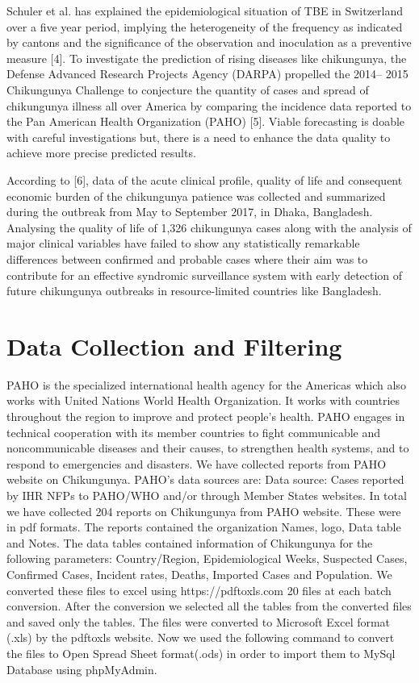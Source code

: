 \documentclass[conference]{IEEEtran}
\begin{document}
Schuler et al. has explained the epidemiological situation of TBE in Switzerland over a five year period, implying the heterogeneity of the frequency as indicated by cantons and the significance of the observation and inoculation as a preventive measure [4]. To investigate the prediction of rising diseases like chikungunya, the Defense Advanced Research Projects Agency (DARPA) propelled the 2014– 2015  Chikungunya Challenge to conjecture the quantity of cases and spread of chikungunya illness all over America by comparing the incidence data reported to the Pan American Health Organization (PAHO) [5]. Viable forecasting is doable with careful investigations but, there is a need to enhance the data quality to achieve more precise predicted results.

According to [6], data of the acute clinical profile, quality of life and consequent economic burden of the chikungunya patience was collected and summarized during the outbreak from May to September 2017, in Dhaka, Bangladesh. Analysing the quality of life of 1,326 chikungunya cases along with the analysis of major clinical variables have failed to show any statistically remarkable differences between confirmed and probable cases where their aim was to contribute for an effective syndromic surveillance system with early detection of future chikungunya outbreaks in resource-limited countries like Bangladesh.


\thispagestyle{empty}
\section{Data Collection and Filtering}

PAHO is the specialized international health agency for the Americas which also works with United Nations World Health Organization.
It works with countries throughout the region to improve and protect people's health. PAHO engages in technical cooperation with its member countries to fight communicable and noncommunicable diseases and their causes, to strengthen health systems, and to respond to emergencies and disasters.
We have collected reports from PAHO website on Chikungunya. PAHO’s data sources are: Data source: Cases reported by IHR NFPs to PAHO/WHO and/or through Member States websites.
In total we have collected 204 reports on Chikungunya from PAHO website. These were in pdf formats.
The reports contained the organization Names, logo, Data table and Notes. The data tables contained information of Chikungunya for the following parameters: Country/Region, Epidemiological Weeks, Suspected Cases, Confirmed Cases, Incident rates, Deaths, Imported Cases and Population.
 We converted these files to excel using https://pdftoxls.com 20 files at each batch conversion. After the conversion we selected all the tables from the converted files and saved only the tables. The files were converted to Microsoft Excel format (.xls) by the pdftoxls website.  Now we used the following command to convert the files to Open Spread Sheet format(.ods) in  order to import them to MySql Database using phpMyAdmin.
\end{document}

